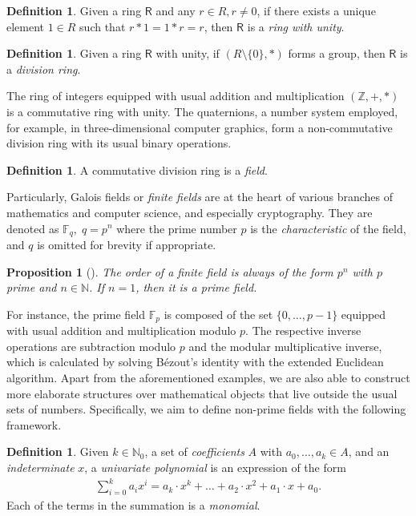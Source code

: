 \documentclass[12pt, a4paper, oneside]{memoir}
\newtheorem{proposition}[theorem]{Proposition}
\theoremstyle{definition}
\newtheorem{definition}[theorem]{Definition}
\begin{document}
\begin{definition}
  Given a ring $\mathsf{R}$ and any $r \in R, r \neq 0$, if there exists a unique element $1 \in R$ such that $r \ast 1 = 1 \ast r = r$, then $\mathsf{R}$ is a \emph{ring with unity}.
\end{definition}

\begin{definition}
  Given a ring $\mathsf{R}$ with unity, if $(R \setminus \{0\}, \ast)$ forms a group, then $\mathsf{R}$ is a \emph{division ring}.
\end{definition}

The ring of integers equipped with usual addition and multiplication $(\mathbb{Z}, +, \ast)$ is a commutative ring with unity. The quaternions, a number system employed, for example, in three-dimensional computer graphics, form a non-commutative division ring with its usual binary operations.

\begin{definition}
  A commutative division ring is a \emph{field}.
\end{definition}

Particularly, Galois fields or \emph{finite fields} are at the heart of various branches of mathematics and computer science, and especially cryptography. They are denoted as $\mathbb{F}_{q},\; q = p^{n}$ where the prime number $p$ is the \emph{characteristic} of the field, and $q$ is omitted for brevity if appropriate.

\begin{proposition}[{\cite[Cor.~2.18]{Mullen:2013}}]
  The order of a finite field is always of the form $p^{n}$ with $p$ prime and $n \in \mathbb{N}$. If $n = 1$, then it is a \emph{prime field}.
\end{proposition}

For instance, the prime field $\mathbb{F}_{p}$ is composed of the set $\{0, \dots, p - 1\}$ equipped with usual addition and multiplication modulo $p$. The respective inverse operations are subtraction modulo $p$ and the modular multiplicative inverse, which is calculated by solving Bézout's identity with the extended Euclidean algorithm. Apart from the aforementioned examples, we are also able to construct more elaborate structures over mathematical objects that live outside the usual sets of numbers. Specifically, we aim to define non-prime fields with the following framework.

\begin{definition}
  Given $k \in \mathbb{N}_{0}$, a set of \emph{coefficients} $A$ with $a_{0}, \dots, a_{k} \in A$, and an \emph{indeterminate} $x$, a \emph{univariate polynomial} is an expression of the form
  \begin{align}
    \sum_{i = 0}^{k} a_{i} x^{i} 
      = a_{k} \cdot x^{k} + \dots + a_{2} \cdot x^{2} + a_{1} \cdot x + a_{0}.
  \end{align}
  Each of the terms in the summation is a \emph{monomial}.
\end{definition}
\end{document}
